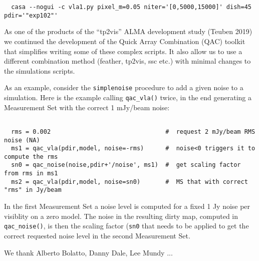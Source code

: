 \documentclass[11pt,twoside]{article}
\begin{document}
\footnotesize
\begin{verbatim}
  casa --nogui -c vla1.py pixel_m=0.05 niter='[0,5000,15000]' dish=45 pdir='"exp102"' 
\end{verbatim}
\normalsize

As one of the products of the ``tp2vis'' ALMA development study (Teuben 2019) we continued the development of the
Quick Array Combination (QAC) toolkit that simplifies writing some of these complex scripts. It also allow us
to use a different combination
method (feather, tp2vis, ssc etc.) with minimal changes to the simulations scripts.

As an example, consider the {\tt simplenoise} procedure to add a given noise to a simulation.
Here is the example calling {\tt qac\_vla()} twice, in the end generating a Measurement Set with
the correct 1 mJy/beam noise:

\footnotesize
\begin{verbatim}

  rms = 0.002                                #  request 2 mJy/beam RMS noise (NA)
  ms1 = qac_vla(pdir,model, noise=-rms)      #  noise<0 triggers it to compute the rms
  sn0 = qac_noise(noise,pdir+'/noise', ms1)  #  get scaling factor from rms in ms1
  ms2 = qac_vla(pdir,model, noise=sn0)       #  MS that with correct "rms" in Jy/beam
\end{verbatim}
\normalsize

In the first Measurement Set a noise level is computed for a fixed 1 Jy noise per visiblity on a
zero model. The noise in the resulting dirty map, computed in {\tt qac\_noise()}, is then the scaling factor ({\tt sn0}
that needs to be applied to get the correct requested noise level in the second Measurement Set.











\acknowledgements We thank Alberto Bolatto, Danny Dale, Lee Mundy ...

\end{document}
